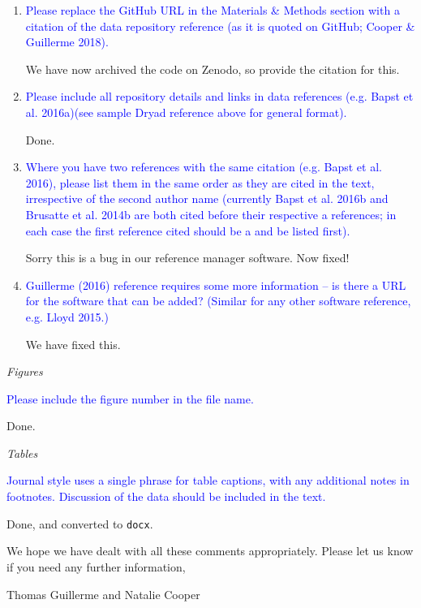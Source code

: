 \documentclass[12pt,letterpaper]{article}
\renewcommand{\subsection}[1]{%
\bigskip
\begin{center}
\begin{large}
\normalfont\itshape #1
\end{large}
\end{center}}
\begin{document}
\begin{enumerate}

\item{\textcolor{blue}{Please replace the GitHub URL in the Materials \& Methods section with a citation of the data repository reference (as it is quoted on GitHub; Cooper \& Guillerme 2018).}}

We have now archived the code on Zenodo, so provide the citation for this.

\item{\textcolor{blue}{Please include all repository details and links in data references (e.g. Bapst et al. 2016a)(see sample Dryad reference above for general format).}}

Done.

\item{\textcolor{blue}{Where you have two references with the same citation (e.g. Bapst et al. 2016), please list them in the same order as they are cited in the text, irrespective of the second author name (currently Bapst et al. 2016b and Brusatte et al. 2014b are both cited before their respective a references; in each case the first reference cited should be a and be listed first).}}

Sorry this is a bug in our reference manager software. Now fixed!

\item{\textcolor{blue}{Guillerme (2016) reference requires some more information – is there a URL for the software that can be added? (Similar for any other software reference, e.g. Lloyd 2015.)}}

We have fixed this.


\end{enumerate}

\subsection{Figures}
\textcolor{blue}{Please include the figure number in the file name.}

Done.

\subsection{Tables}
\textcolor{blue}{Journal style uses a single phrase for table captions, with any additional notes in footnotes. Discussion of the data should be included in the text.}

Done, and converted to \texttt{docx}.

\bigskip

We hope we have dealt with all these comments appropriately. 
Please let us know if you need any further information,

\bigskip

Thomas Guillerme and Natalie Cooper
\end{document}
